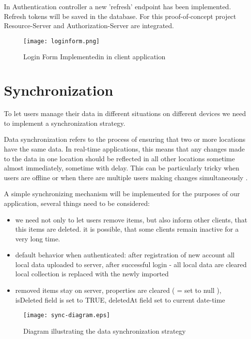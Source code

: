 In Authentication controller a new 'refresh' endpoint has been implemented. Refresh tokens will be saved in the database. For this proof-of-concept project Resource-Server and Authorization-Server are integrated.

\begin{figure}[H]
    \centering
    \texttt{[image: loginform.png]}
    \caption[Proof-of-concept Login form]{\label{fig:loginform} Login Form Implementedin in client application }
\end{figure}


\section{{Synchronization}}%
\label{sec:synchronization}

To let users manage their data in different situations on different devices we need to implement a synchronization strategy. 

Data synchronization refers to the process of ensuring that two or more locations have the same data. In real-time applications, this means that any changes made to the data in one location should be reflected in all other locations sometime almost immediately, sometime with delay. This can be particularly tricky when users are offline or when there are multiple users making changes simultaneously \autocite{SyncPeerDH}.

A simple synchronizing mechanism will be implemented for the purposes of our application, several things need to be considered:
\begin{itemize}
    \item we need not only to let users remove items, but also inform other clients, that this items are deleted. it is possible, that some clients remain inactive for a very long time.
    \item default behavior when authenticated: after registration of new account all local data uploaded to server, after successful login - all local data are cleared local collection is replaced with the newly imported
    \item removed items stay on server, properties are cleared ( = set to null ), isDeleted field is set to TRUE, deletedAt field set to current date-time
\end{itemize}

\begin{figure}[H]
    \centering
    \texttt{[image: sync-diagram.eps]}
    \caption[Synchronization strategy diagram]{\label{fig:syncdiagram} Diagram illustrating the data synchronization strategy  }
\end{figure}

